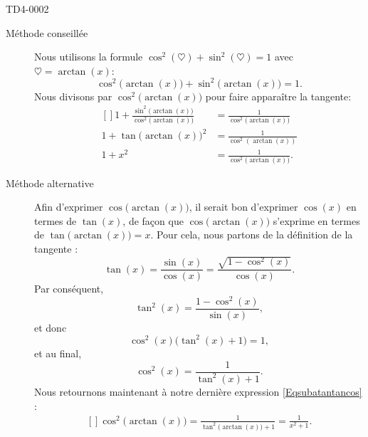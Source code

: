 \begin{corrige}{TD4-0002}
\begin{enumerate}
            \begin{description}
                \item[Méthode conseillée] 
                        Nous utilisons la formule \( \cos^2(\heartsuit)+\sin^2(\heartsuit)=1\) avec \( \heartsuit=\arctan(x)\):
                        \begin{equation}
                            \cos^2\big( \arctan(x) \big)+\sin^2\big( \arctan(x) \big)=1.
                        \end{equation}
                        Nous divisons par \( \cos^2\big( \arctan(x) \big)\) pour faire apparaître la tangente:
                        \begin{equation}
                            \begin{aligned}[]
                                1+\frac{ \sin^2\big( \arctan(x) \big) }{  \cos^2\big( \arctan(x) \big)  }&=\frac{1}{  \cos^2\big( \arctan(x) \big)  }\\
                                1+\tan\big( \arctan(x) \big)^2&=\frac{1}{ \cos^2(\arctan(x)) }\\
                                1+x^2&=\frac{1}{ \cos^2\big( \arctan(x) \big) }.
                            \end{aligned}
                        \end{equation}
                        
                \item[Méthode alternative]

            Afin d'exprimer \( \cos\big( \arctan(x) \big)\),  il serait bon d'exprimer $\cos(x)$ en termes de $\tan(x)$, de façon que $\cos\big( \arctan(x) \big)$ s'exprime en termes de $\tan\big( \arctan(x) \big)=x$. Pour cela, nous partons de la définition de la tangente :
			\begin{equation}
				\tan(x)=\frac{ \sin(x) }{ \cos(x) }=\frac{ \sqrt{1-\cos^2(x)} }{ \cos(x) }.
			\end{equation}
			Par conséquent,
			\begin{equation}
				\tan^2(x)=\frac{ 1-\cos^2(x) }{ \sin(x) },
			\end{equation}
			et donc
			\begin{equation}
				\cos^2(x)\big( \tan^2(x)+1 \big)=1,
			\end{equation}
			et au final,
			\begin{equation}
				\cos^2(x)=\frac{1}{ \tan^2(x)+1 }.
			\end{equation}
			Nous retournons maintenant à notre dernière expression \eqref{Eqsubatantancos} :
			\begin{equation}
				\begin{aligned}[]
					\cos^2\big( \arctan(x) \big)=\frac{1}{ \tan^2\big( \arctan(x) \big)+1 }=\frac{1}{ x^2+1 }.
				\end{aligned}
			\end{equation}


\end{description}
\end{enumerate}
\end{corrige}
